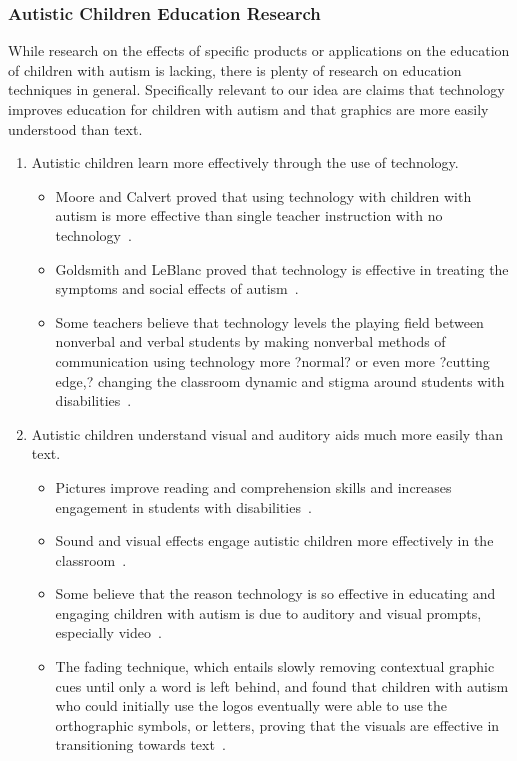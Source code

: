 \subsubsection{Autistic Children Education Research}
While research on the effects of specific products or applications on the education of children with autism is lacking, there is plenty of research on education techniques in general. Specifically relevant to our idea are claims that technology improves education for children with autism and that graphics are more easily understood than text.
\begin{enumerate}\bfseries
\item Autistic children learn more effectively through the use of technology.
\begin{itemize}
\item  \textnormal{Moore and Calvert proved that using technology with children with autism is more effective than single teacher instruction with no technology~\cite{moore}.}
\item  \textnormal{Goldsmith and LeBlanc proved that technology is effective in treating the symptoms and social effects of autism~\cite{goldsmith}.}
\item  \textnormal{Some teachers believe that technology levels the playing field between nonverbal and verbal students by making nonverbal methods of communication using technology more ?normal? or even more ?cutting edge,? changing the classroom dynamic and stigma around students with disabilities~\cite{riechmann}.}
\end{itemize}
\item Autistic children  understand visual and auditory aids much more easily than text.
\begin{itemize}
\item  \textnormal{Pictures improve reading and comprehension skills and increases engagement in students with disabilities~\cite{slater}.}
\item  \textnormal{Sound and visual effects engage autistic children more effectively in the classroom~\cite{moore}.}
\item  \textnormal{Some believe that the reason technology is so effective in educating and engaging children with autism is due to auditory and visual prompts, especially video~\cite{goldsmith}.}
\item  \textnormal{The fading technique, which entails slowly removing contextual graphic cues until only a word is left behind, and found that children with autism who could initially use the logos eventually were able to use the orthographic symbols, or letters, proving that the visuals are effective in transitioning towards text~\cite{hetzroni}.}
\end{itemize}
\end{enumerate}

